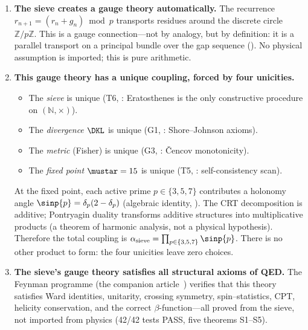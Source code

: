 \documentclass[12pt,a4paper]{article}
\begin{document}
\begin{tcolorbox}[colback=thmblue!5, colframe=thmblue!60, title={\textbf{The argument in five steps}}]
\begin{enumerate}[leftmargin=*, label=\textbf{\arabic*.}]
\item \textbf{The sieve creates a gauge theory automatically.}
  The recurrence $r_{n+1} = (r_n + g_n) \bmod p$ transports residues
  around the discrete circle $\mathbb{Z}/p\mathbb{Z}$.  This is a
  gauge connection---not by analogy, but by definition: it is a
  parallel transport on a principal bundle over the gap sequence
  (\cite{companion_M1}).  No physical assumption is imported; this is pure
  arithmetic.

\item \textbf{This gauge theory has a unique coupling, forced by four unicities.}
  \begin{itemize}[nosep]
  \item The \emph{sieve} is unique (T6, \cite{companion_M2}: Eratosthenes is the
    only constructive procedure on $(\mathbb{N}, \times)$).
  \item The \emph{divergence} $\DKL$ is unique (G1, \cite{companion_M2}:
    Shore--Johnson axioms).
  \item The \emph{metric} (Fisher) is unique (G3, \cite{companion_M2}: \v{C}encov
    monotonicity).
  \item The \emph{fixed point} $\mustar = 15$ is unique (T5, \cite{companion_M3}:
    self-consistency scan).
  \end{itemize}
  At the fixed point, each active prime $p \in \{3, 5, 7\}$ contributes
  a holonomy angle $\sinp{p} = \delta_p(2 - \delta_p)$ (algebraic identity,
  \cite{companion_M2}).  The CRT decomposition is additive;
  Pontryagin duality transforms additive structures into multiplicative
  products (a theorem of harmonic analysis, not a physical hypothesis).
  Therefore the total coupling is $\alpha_{\rm sieve} =
  \prod_{p \in \{3,5,7\}} \sinp{p}$.  There is no other product to
  form: the four unicities leave zero choices.

\item \textbf{The sieve's gauge theory satisfies all structural axioms of QED.}
  The Feynman programme (the companion article~\cite{companion_physics}) verifies that this theory satisfies
  Ward identities, unitarity, crossing symmetry, spin--statistics, CPT,
  helicity conservation, and the correct $\beta$-function---all proved
  from the sieve, not imported from physics (42/42 tests PASS, five
  theorems S1--S5).


\end{enumerate}
\end{tcolorbox}
\end{document}

